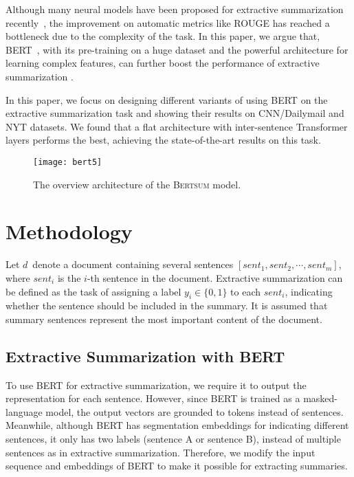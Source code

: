 \documentclass[11pt,a4paper]{article}
\begin{document}
    Although many neural models have been proposed for extractive summarization recently~\citep{cheng2016neural,nallapati2017summarunner,narayan2018ranking, dong2018banditsum, zhang2018neural, zhou2018neural}, the improvement on automatic metrics like ROUGE has reached a bottleneck due to the complexity of the task.
       In this paper, we argue that,  BERT~\citep{devlin2018bert}, with its pre-training on a huge dataset and the powerful architecture for learning complex features, can further boost the performance of extractive summarization .
    
    In this paper, we focus on designing different variants of using BERT on the extractive summarization task and showing their results on CNN/Dailymail and NYT datasets.
    We found that a flat architecture with inter-sentence Transformer layers performs the best, achieving the state-of-the-art results on this task.
    
    
    \begin{figure*}[t]
        \centering
        \texttt{[image: bert5]}
        \label{trans}
        \caption{The overview  architecture of the \textsc{Bertsum} model.}
    \end{figure*}
    
    
    
    
    \section{Methodology}
    
    
    
    
Let $d$~denote a document containing several sentences
    $[sent_1, sent_2, \cdots, sent_m]$, where $sent_i$ is the $i$-th
    sentence in the document.  Extractive summarization can be defined as
    the task of assigning a label $y_i \in \{0, 1\}$ to each $sent_i$,
    indicating whether the sentence should be included in the summary. It
    is assumed that summary sentences represent the most important content    of the document.
    
    \subsection{Extractive Summarization with BERT}
    
    To use BERT for extractive summarization, we require it to output the representation for each sentence. However, since BERT is trained as a masked-language model, the output vectors are grounded to tokens instead of sentences. Meanwhile, although BERT has segmentation embeddings for indicating different sentences, it only has two labels (sentence A or sentence B), instead of multiple sentences as in extractive summarization.
    Therefore, we modify the input sequence and embeddings of  BERT to make it possible for extracting summaries.
    
\end{document}
